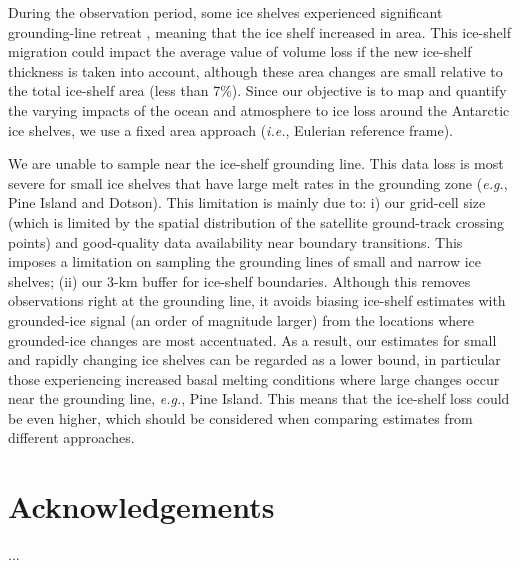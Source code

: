 During the observation period, some ice shelves experienced significant
grounding-line retreat \parencite{Rignot2014}, meaning that the ice shelf
increased in area. This ice-shelf migration could impact the average value of
volume loss if the new ice-shelf thickness is taken into account, although
these area changes are small relative to the total ice-shelf area (less than
7\%). Since our objective is to map and quantify the varying impacts of the
ocean and atmosphere to ice loss around the Antarctic ice shelves, we use a
fixed area approach ({\it i.e.}, Eulerian reference frame).

We are unable to sample near the ice-shelf grounding line. This data loss is
most severe for small ice shelves that have large melt rates in the grounding
zone ({\it e.g.}, Pine Island and Dotson). This limitation is mainly due to: i) our
grid-cell size (which is limited by the spatial distribution of the satellite
ground-track crossing points) and good-quality data availability near boundary
transitions. This imposes a limitation on sampling the grounding lines of small
and narrow ice shelves; (ii) our 3-km buffer for ice-shelf boundaries. Although
this removes observations right at the grounding line, it avoids biasing
ice-shelf estimates with grounded-ice signal (an order of magnitude larger)
from the locations where grounded-ice changes are most accentuated. As a
result, our estimates for small and rapidly changing ice shelves can be
regarded as a lower bound, in particular those experiencing increased basal
melting conditions where large changes occur near the grounding line, {\it e.g.},
Pine Island. This means that the ice-shelf loss could be even higher, which
should be considered when comparing estimates from different approaches.

\section*{Acknowledgements}
...
